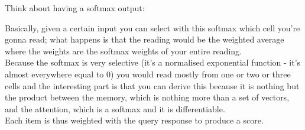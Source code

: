Think about having a softmax output: 

Basically, given a certain input you can select with this softmax which cell you’re gonna read; what happens is that the reading would be the weighted average where the weights are the softmax weights of your entire reading. \\
Because the softmax is very selective (it’s a normalised exponential function - it's almost everywhere equal to 0) you would read mostly from one or two or three cells 
and the interesting part is that you can derive this because it is nothing but the product between the memory, which is nothing more than a set of vectors, and the attention, which is a softmax and it is differentiable.\\
Each item is thus weighted with the query response to produce a score.\\




